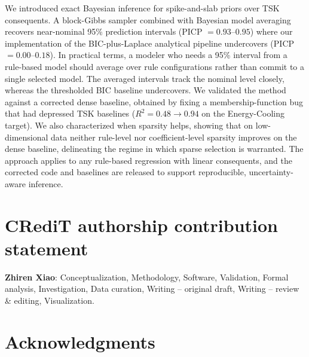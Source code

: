 \documentclass[review,1p,times]{elsarticle}
\begin{document}
We introduced exact Bayesian inference for spike-and-slab priors over TSK consequents.
A block-Gibbs sampler combined with Bayesian model averaging recovers near-nominal 95\% prediction intervals (PICP $=0.93$--$0.95$) where our implementation of the BIC-plus-Laplace analytical pipeline undercovers (PICP $=0.00$--$0.18$).
In practical terms, a modeler who needs a 95\% interval from a rule-based model should average over rule configurations rather than commit to a single selected model.
The averaged intervals track the nominal level closely, whereas the thresholded BIC baseline undercovers. We validated the method against a corrected dense baseline, obtained by fixing a membership-function bug that had depressed TSK baselines ($R^2=0.48\rightarrow0.94$ on the Energy-Cooling target). We also characterized when sparsity helps, showing that on low-dimensional data neither rule-level nor coefficient-level sparsity improves on the dense baseline, delineating the regime in which sparse selection is warranted. The approach applies to any rule-based regression with linear consequents, and the corrected code and baselines are released to support reproducible, uncertainty-aware inference.

\section*{CRediT authorship contribution statement}

\textbf{Zhiren Xiao}: Conceptualization, Methodology, Software, Validation, Formal analysis, Investigation, Data curation, Writing -- original draft, Writing -- review \& editing, Visualization.

\section*{Acknowledgments}
\end{document}
